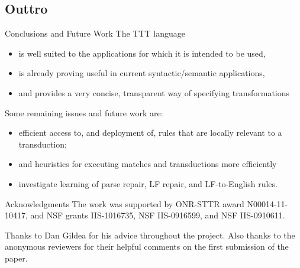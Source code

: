 \documentclass[8pt]{beamer}
\begin{document}
\subsection{Outtro}
\begin{frame}{Conclusions and Future Work}
The TTT language 
\begin{itemize}
\item is well suited to the applications for which it is intended to be used,
\item is already proving useful in current syntactic/semantic applications, 
\item and provides a very concise, transparent way of specifying transformations 
\end{itemize}

Some remaining issues  and future work are:
\begin{itemize}
\item efficient access to, and deployment of, rules that are locally relevant to a transduction; 
\item and heuristics for executing matches and transductions more efficiently 
\item investigate learning of parse repair, LF repair, and LF-to-English rules.
\end{itemize}
\end{frame}


\begin{frame}{Acknowledgments}
The work was supported by ONR-STTR award N00014-11-10417, and NSF grants IIS-1016735,  NSF IIS-0916599, and NSF IIS-0910611.

Thanks to Dan Gildea for his advice throughout the project. Also thanks to the anonymous reviewers for their helpful comments on the first submission of the paper. 
\end{frame}
\end{document}
